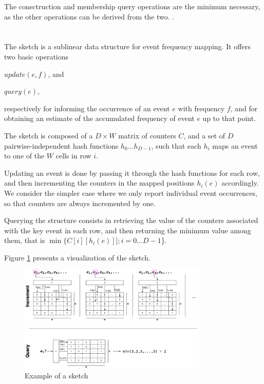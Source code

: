 The consctruction and membership query operations are the minimum necessary, as the other operations can be derived from the two. .

\section{\cm}
\label{sec:countmin}

The \cm sketch \cite{Cormode2005} is a sublinear data structure for event frequency mapping.
It offers two basic operations
\begin{compactenum}
\item $update(e, f)$, and
\item $query(e)$,
\end{compactenum}
respectively for informing the occurrence of an event $e$ with frequency $f$, and for obtaining an estimate of the accumulated frequency of event $e$ up to that point.

The sketch is composed of a $D\times W$ matrix of counters $C$, and a set of $D$ pairwise-independent hash functions $h_0\ldots h_{D-1}$, such that each $h_i$ maps an event to one of the $W$ cells in row $i$.


Updating an event is done by passing it through the hash functions for each row, and then incrementing the counters in
the mapped positions $h_i(e)$ accordingly. 
We consider the simpler case where we only report individual event occurrences, so that counters are always incremented by one.

Querying the structure consists in retrieving the value of the counters associated with the key event in each row,  and then returning
the minimum value among them, that is $\min\{C[i][h_i(e)]]; i=0\ldots D-1$\}.


Figure \ref{fig:countminexample} presents a visualization of the \cm sketch.

\begin{figure}[htbp]
	\begin{center}
    \includegraphics[width=0.8\textwidth]{figures/cm-example}
	\end{center}
	\caption{Example of a \cm sketch}\label{fig:countminexample}
\end{figure}

